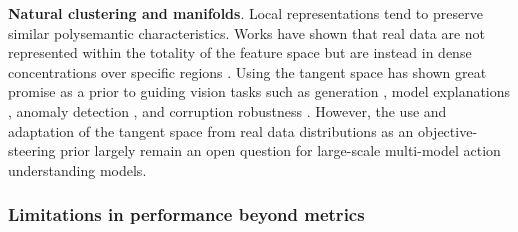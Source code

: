 \noindent
\textbf{Natural clustering and manifolds}. Local representations tend to preserve similar polysemantic characteristics. Works have shown that real data are not represented within the totality of the feature space but are instead in dense concentrations over specific regions \citep{genovese2012minimax,jiang2018trust,liang2022mind}. Using the tangent space has shown great promise as a prior to guiding vision tasks such as generation \citep{he2023manifold}, model explanations \citep{bordt2023manifold}, anomaly detection \citep{shin2023anomaly}, and corruption robustness \citep{chen2022vita}. However, the use and adaptation of the tangent space from real data distributions as an objective-steering prior largely remain an open question for large-scale multi-model action understanding models. 






\subsubsection{Limitations in performance beyond metrics}

